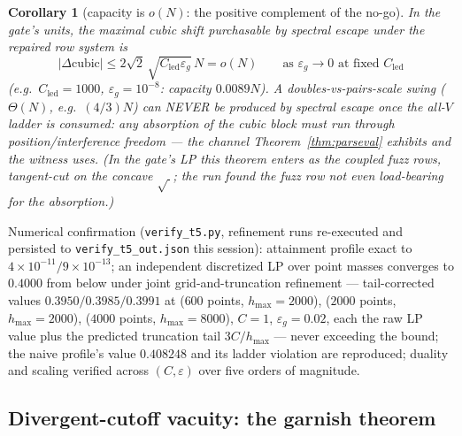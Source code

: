 \documentclass[11pt]{article}
\theoremstyle{plain}
\newtheorem{corollary}[theorem]{Corollary}
\theoremstyle{definition}
\theoremstyle{remark}
\newcommand{\Cled}{C_{\mathrm{led}}}
\begin{document}
\begin{corollary}[capacity is $o(N)$: the positive complement of the no-go]
\label{cor:oN}
In the gate's units, the maximal cubic shift purchasable by spectral escape under
the repaired row system is
\[
  |\Delta \text{cubic}| \le 2\sqrt{2}\,\sqrt{\Cled \varepsilon_g}\, N = o(N)
  \qquad \text{as } \varepsilon_g \to 0 \text{ at fixed } \Cled
\]
(e.g.\ $\Cled = 1000$, $\varepsilon_g = 10^{-8}$: capacity $0.0089 N$). A
doubles-vs-pairs-scale swing ($\Theta(N)$, e.g.\ $(4/3)N$) can NEVER be produced
by spectral escape once the all-$V$ ladder is consumed: any absorption of the
cubic block must run through position/interference freedom --- the channel
Theorem~\ref{thm:parseval} exhibits and the witness uses. (In the gate's LP this
theorem enters as the coupled fuzz rows, tangent-cut on the concave $\sqrt{\ }$;
the run found the fuzz row not even load-bearing for the absorption.)
\end{corollary}

Numerical confirmation (\texttt{verify\_t5.py}, refinement runs re-executed and
persisted to \texttt{verify\_t5\_}\allowbreak\texttt{out.json} this session): attainment profile exact
to $4 \times 10^{-11} / 9 \times 10^{-13}$; an independent discretized LP over
point masses converges to $0.4000$ from below under joint grid-and-truncation
refinement --- tail-corrected values $0.3950 / 0.3985 / 0.3991$ at
($600$ points, $h_{\max} = 2000$), ($2000$ points, $h_{\max} = 2000$),
($4000$ points, $h_{\max} = 8000$), $C = 1$, $\varepsilon_g = 0.02$, each the raw
LP value plus the predicted truncation tail $3C/h_{\max}$ --- never exceeding the
bound; the naive profile's value $0.408248$ and its ladder violation are
reproduced; duality and scaling verified across $(C, \varepsilon)$ over five
orders of magnitude.

\subsection{Divergent-cutoff vacuity: the garnish theorem}
\end{document}
